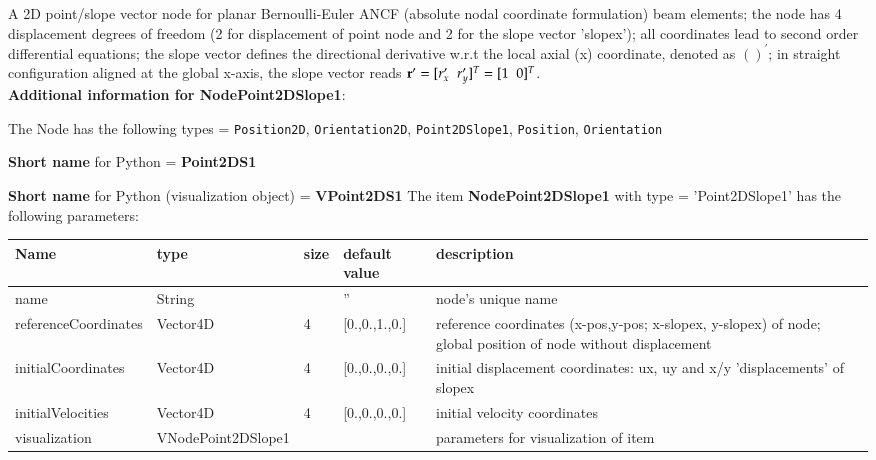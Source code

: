 \label{sec:item:NodePoint2DSlope1}
A 2D point/slope vector node for planar Bernoulli-Euler ANCF (absolute nodal coordinate formulation) beam elements; the node has 4 displacement degrees of freedom (2 for displacement of point node and 2 for the slope vector 'slopex'); all coordinates lead to second order differential equations; the slope vector defines the directional derivative w.r.t the local axial (x) coordinate, denoted as $()^\prime$; in straight configuration aligned at the global x-axis, the slope vector reads $\mathbf{r}^\prime=[r_x^\prime\;\;r_y^\prime]^T=[1\;\;0]^T$.\vspace{12pt}
 \\{\bf Additional information for NodePoint2DSlope1}:
\bi
  \item The Node has the following types = \texttt{Position2D}, \texttt{Orientation2D}, \texttt{Point2DSlope1}, \texttt{Position}, \texttt{Orientation}
  \item {\bf Short name} for Python = {\bf Point2DS1}  \item {\bf Short name} for Python (visualization object) = {\bf VPoint2DS1}\ei
\vspace{12pt} \noindent The item {\bf NodePoint2DSlope1} with type = 'Point2DSlope1' has the following parameters:\vspace{-1cm}\\ 
\begin{center}
  \footnotesize
  \begin{longtable}{| p{4.5cm} | p{2.5cm} | p{0.5cm} | p{2.5cm} | p{6cm} |}
    \hline
    \bf Name & \bf type & \bf size & \bf default value & \bf description \\ \hline
    name &     String &      &     '' &     node's unique name\\ \hline
    referenceCoordinates &     Vector4D &     4 &     [0.,0.,1.,0.] &     reference coordinates (x-pos,y-pos; x-slopex, y-slopex) of node; global position of node without displacement\\ \hline
    initialCoordinates &     Vector4D &     4 &     [0.,0.,0.,0.] &     initial displacement coordinates: ux, uy and x/y 'displacements' of slopex\\ \hline
    initialVelocities &     Vector4D &     4 &     [0.,0.,0.,0.] &     initial velocity coordinates\\ \hline
    visualization & VNodePoint2DSlope1 & & & parameters for visualization of item \\ \hline
	  \end{longtable}
	\end{center}
